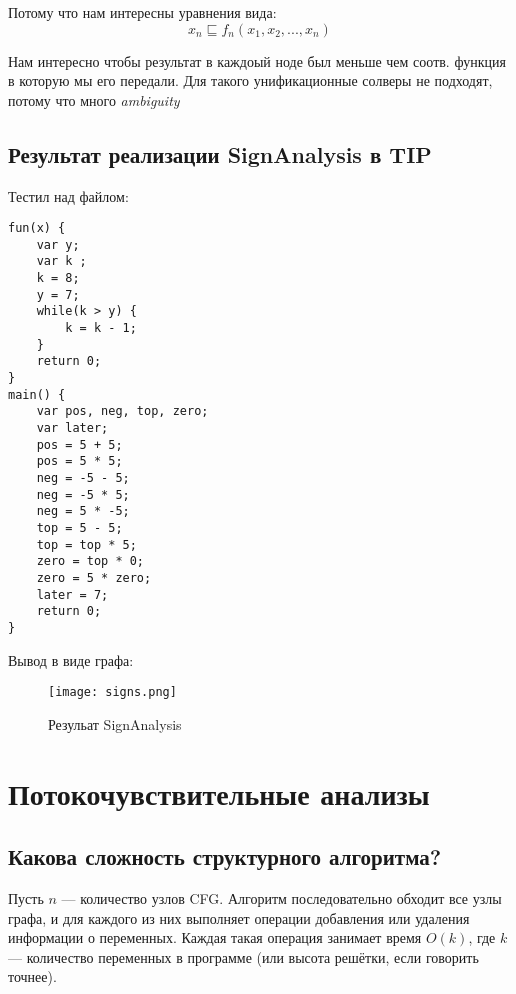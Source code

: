 \documentclass{report}
\begin{document}
Потому что нам интересны уравнения вида:
$$
x_n \sqsubseteq f_n(x_1, x_2, ..., x_n)
$$

Нам интересно чтобы результат в каждоый ноде был меньше чем соотв. функция в которую мы его передали.
Для такого унификационные солверы не подходят, потому что много \textit{ambiguity}

\section{Результат реализации SignAnalysis в TIP}

Тестил над файлом:
\begin{lstlisting}
fun(x) {
    var y;
    var k ;
    k = 8;
    y = 7;
    while(k > y) {
        k = k - 1;
    }
    return 0;
}
main() {
    var pos, neg, top, zero;
    var later;
    pos = 5 + 5;
    pos = 5 * 5;
    neg = -5 - 5;
    neg = -5 * 5;
    neg = 5 * -5;
    top = 5 - 5;
    top = top * 5;
    zero = top * 0;
    zero = 5 * zero;
    later = 7;
    return 0;
}
\end{lstlisting}

Вывод в виде графа:

\begin{figure}
    \centering
    \texttt{[image: signs.png]}
    \caption{Резульат SignAnalysis}
    \label{fig:hi}
\end{figure}


\printbibliography




\chapter{Потокочувствительные анализы}

\section{Какова сложность структурного алгоритма?}

Пусть $ n $ — количество узлов CFG. Алгоритм последовательно обходит все узлы графа, и для каждого из них выполняет операции добавления или удаления информации о переменных. Каждая такая операция занимает время $ O(k) $, где $ k $ — количество переменных в программе (или высота решётки, если говорить точнее).
\end{document}
